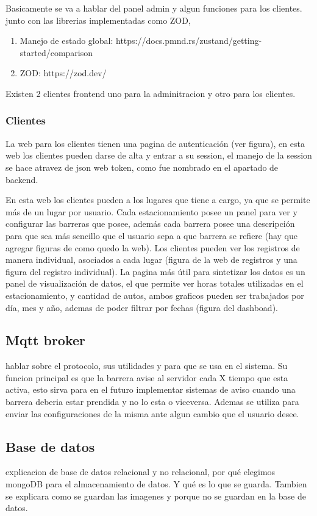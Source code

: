 Basicamente se va a hablar del panel admin y algun funciones para los clientes. junto con las librerias implementadas como ZOD,

\begin{enumerate}
        \item Manejo de estado global: https://docs.pmnd.rs/zustand/getting-started/comparison
        \item ZOD: https://zod.dev/
\end{enumerate}

Existen 2 clientes frontend uno para la adminitracion y otro para los clientes.

\subsubsection{Clientes}

La web para los clientes tienen una pagina de autenticación (ver figura), en esta web los clientes pueden darse de alta y entrar a su session, el manejo de la session se hace atravez de json web token, como fue nombrado en el apartado de backend.

En esta web los clientes pueden a los lugares que tiene a cargo, ya que se permite más de un lugar por usuario. Cada estacionamiento posee un panel para ver y configurar las barreras que posee, además cada barrera posee una descripción para que sea más sencillo que el usuario sepa a que barrera se refiere (hay que agregar figuras de como quedo la web). Los clientes pueden ver los registros de manera individual, asociados a cada lugar (figura de la web de registros y una figura del registro individual). La pagina más útil para sintetizar los datos es un panel de visualización de datos, el que permite ver horas totales utilizadas en el estacionamiento, y cantidad de autos, ambos graficos pueden ser trabajados por día, mes y año, ademas de poder filtrar por fechas (figura del dashboad).

\subsection{Mqtt broker}

hablar sobre el protocolo, sus utilidades y para que se usa en el sistema. Su funcion principal es que la barrera avise al servidor cada X tiempo que esta activa,
esto sirva para en el futuro implementar sistemas de aviso cuando una barrera deberia estar prendida y no lo esta o viceversa. Ademas se utiliza para enviar las configuraciones de la misma ante algun cambio que el usuario desee.

\subsection{Base de datos}

explicacion de base de datos relacional y no relacional, por qué elegimos mongoDB para el almacenamiento de datos. Y qué es lo que se guarda. Tambien se explicara como se guardan las imagenes y porque no se guardan en la base de datos.




